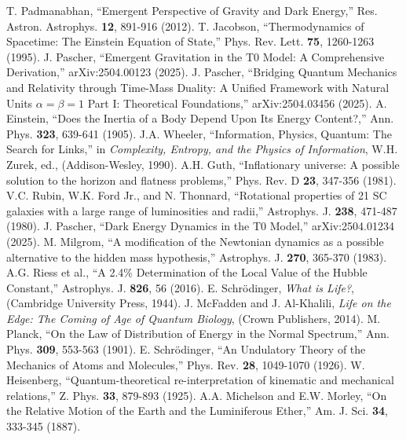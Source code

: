 \documentclass[twocolumn,aps,prl]{revtex4-2}
\begin{document}
\begin{thebibliography}{99}
		 T. Padmanabhan, ``Emergent Perspective of Gravity and Dark Energy,'' Res. Astron. Astrophys. \textbf{12}, 891-916 (2012).
		 T. Jacobson, ``Thermodynamics of Spacetime: The Einstein Equation of State,'' Phys. Rev. Lett. \textbf{75}, 1260-1263 (1995).
		 J. Pascher, ``Emergent Gravitation in the T0 Model: A Comprehensive Derivation,'' arXiv:2504.00123 (2025).
		 J. Pascher, ``Bridging Quantum Mechanics and Relativity through Time-Mass Duality: A Unified Framework with Natural Units $\alpha = \beta = 1$ Part I: Theoretical Foundations,'' arXiv:2504.03456 (2025).
		 A. Einstein, ``Does the Inertia of a Body Depend Upon Its Energy Content?,'' Ann. Phys. \textbf{323}, 639-641 (1905).
		 J.A. Wheeler, ``Information, Physics, Quantum: The Search for Links,'' in \textit{Complexity, Entropy, and the Physics of Information}, W.H. Zurek, ed., (Addison-Wesley, 1990).
		 A.H. Guth, ``Inflationary universe: A possible solution to the horizon and flatness problems,'' Phys. Rev. D \textbf{23}, 347-356 (1981).
		 V.C. Rubin, W.K. Ford Jr., and N. Thonnard, ``Rotational properties of 21 SC galaxies with a large range of luminosities and radii,'' Astrophys. J. \textbf{238}, 471-487 (1980).
		 J. Pascher, ``Dark Energy Dynamics in the T0 Model,'' arXiv:2504.01234 (2025).
		 M. Milgrom, ``A modification of the Newtonian dynamics as a possible alternative to the hidden mass hypothesis,'' Astrophys. J. \textbf{270}, 365-370 (1983).
		 A.G. Riess et al., ``A 2.4\% Determination of the Local Value of the Hubble Constant,'' Astrophys. J. \textbf{826}, 56 (2016).
		 E. Schrödinger, \textit{What is Life?}, (Cambridge University Press, 1944).
		 J. McFadden and J. Al-Khalili, \textit{Life on the Edge: The Coming of Age of Quantum Biology}, (Crown Publishers, 2014).
		 M. Planck, ``On the Law of Distribution of Energy in the Normal Spectrum,'' Ann. Phys. \textbf{309}, 553-563 (1901).
		 E. Schrödinger, ``An Undulatory Theory of the Mechanics of Atoms and Molecules,'' Phys. Rev. \textbf{28}, 1049-1070 (1926).
		 W. Heisenberg, ``Quantum-theoretical re-interpretation of kinematic and mechanical relations,'' Z. Phys. \textbf{33}, 879-893 (1925).
		 A.A. Michelson and E.W. Morley, ``On the Relative Motion of the Earth and the Luminiferous Ether,'' Am. J. Sci. \textbf{34}, 333-345 (1887).

\end{thebibliography}
\end{document}
